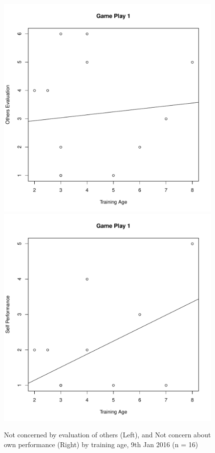 \begin{CJK}{UTF8}{gbsn}
\begin{figure}[htbp]
  \centering
\includegraphics[scale=.3]{images/othersEval0109TrainingAge.pdf}
\includegraphics[scale=.3]{images/indPerf0109TrainingAge.pdf}
  \caption{Not concerned by evaluation of others (Left), and Not concern about own performance (Right) by training age,  9th Jan 2016 (n = 16)}
  \label{fig:othersEvalIndPerf0109TrainingAge}
\end{figure}



\end{CJK}

